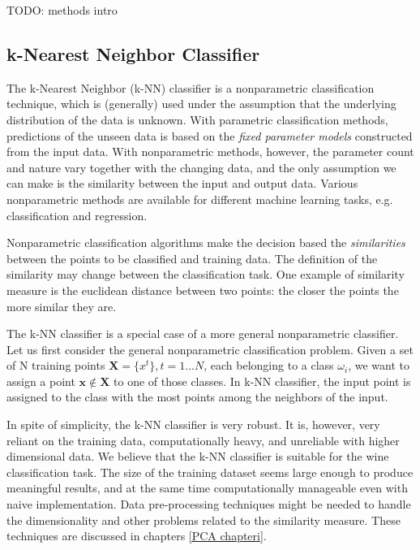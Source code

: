 \label{sec:methods}
TODO: methods intro

\subsection{k-Nearest Neighbor Classifier}
The k-Nearest Neighbor (k-NN) classifier is a nonparametric classification technique, which is (generally) used under the assumption that the underlying distribution of the data is unknown. With parametric classification methods, predictions of the unseen data is based on the \emph{fixed parameter models} constructed from the input data. With nonparametric methods, however, the parameter count and nature vary together with the changing data, and the only assumption we can make is the similarity between the input and output data. Various nonparametric methods are available for different machine learning tasks, e.g. classification and regression. \cite{alpaydin:2004:introduction} %

Nonparametric classification algorithms make the decision based the \emph{similarities} between the points to be classified and training data. The definition of the similarity may change between the classification task. One example of similarity measure is the euclidean distance between two points: the closer the points the more similar they are.

The k-NN classifier is a special case of a more general nonparametric classifier. Let us first consider the general nonparametric classification problem. Given a set of N training points  $\mathbf{X} = \{x^{t}\}, t=1...N$, each belonging to a class $\omega_{i}$, we want to assign a point $\mathbf{x} \notin \mathbf{X}$ to one of those classes. In k-NN classifier, the input point is assigned to the class with the most points among the neighbors of the input.

In spite of simplicity, the k-NN classifier is very robust. It is, however, very reliant on the
training data, computationally heavy, and unreliable with higher dimensional data. We believe that the k-NN classifier is suitable for the wine classification task. The size of the training dataset seems large enough to produce meaningful results, and at the same time computationally manageable even with naive implementation. Data pre-processing techniques might be needed to handle the dimensionality and other problems related to the similarity measure. These techniques are discussed in chapters \ref{PCA chapteri}.


